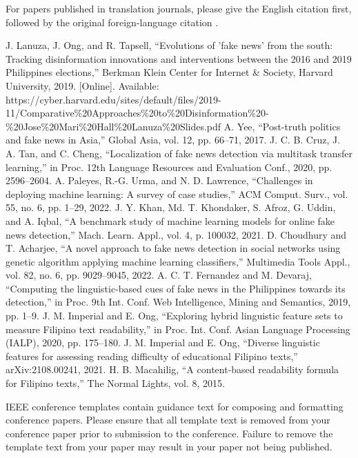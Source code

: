 \documentclass[conference]{IEEEtran}
\begin{document}
For papers published in translation journals, please give the English 
citation first, followed by the original foreign-language citation \cite{b6}.

\begin{thebibliography}{00}
 J. Lanuza, J. Ong, and R. Tapsell, ``Evolutions of 'fake news' from the south: Tracking disinformation innovations and interventions between the 2016 and 2019 Philippines elections,'' Berkman Klein Center for Internet \& Society, Harvard University, 2019. [Online]. Available: https://cyber.harvard.edu/sites/default/files/2019-11/Comparative\%20Approaches\%20to\%20Disinformation\%20-\%20Jose\%20Mari\%20Hall\%20Lanuza\%20Slides.pdf
 A. Yee, ``Post-truth politics and fake news in Asia,'' Global Asia, vol. 12, pp. 66--71, 2017.
 J. C. B. Cruz, J. A. Tan, and C. Cheng, ``Localization of fake news detection via multitask transfer learning,'' in Proc. 12th Language Resources and Evaluation Conf., 2020, pp. 2596--2604.
 A. Paleyes, R.-G. Urma, and N. D. Lawrence, ``Challenges in deploying machine learning: A survey of case studies,'' ACM Comput. Surv., vol. 55, no. 6, pp. 1--29, 2022.
 J. Y. Khan, Md. T. Khondaker, S. Afroz, G. Uddin, and A. Iqbal, ``A benchmark study of machine learning models for online fake news detection,'' Mach. Learn. Appl., vol. 4, p. 100032, 2021.
 D. Choudhury and T. Acharjee, ``A novel approach to fake news detection in social networks using genetic algorithm applying machine learning classifiers,'' Multimedia Tools Appl., vol. 82, no. 6, pp. 9029--9045, 2022.
 A. C. T. Fernandez and M. Devaraj, ``Computing the linguistic-based cues of fake news in the Philippines towards its detection,'' in Proc. 9th Int. Conf. Web Intelligence, Mining and Semantics, 2019, pp. 1--9.
 J. M. Imperial and E. Ong, ``Exploring hybrid linguistic feature sets to measure Filipino text readability,'' in Proc. Int. Conf. Asian Language Processing (IALP), 2020, pp. 175--180.
 J. M. Imperial and E. Ong, ``Diverse linguistic features for assessing reading difficulty of educational Filipino texts,'' arXiv:2108.00241, 2021.
 H. B. Macahilig, ``A content-based readability formula for Filipino texts,'' The Normal Lights, vol. 8, 2015.
\end{thebibliography}
\vspace{12pt}
\color{red}
IEEE conference templates contain guidance text for composing and formatting conference papers. Please ensure that all template text is removed from your conference paper prior to submission to the conference. Failure to remove the template text from your paper may result in your paper not being published.
\end{document}
